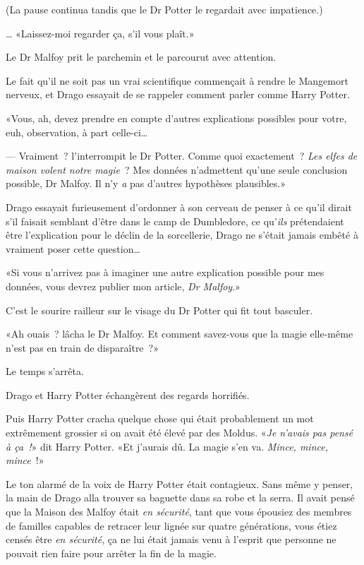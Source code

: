(La pause continua tandis que le Dr Potter le regardait avec impatience.)

… «Laissez-moi regarder ça, s'il vous plaît.»

Le Dr Malfoy prit le parchemin et le parcourut avec attention.

Le fait qu'il ne soit pas un vrai scientifique commençait à rendre le Mangemort nerveux, et Drago essayait de se rappeler comment parler comme Harry Potter.

«Vous, ah, devez prendre en compte d'autres explications possibles pour votre, euh, observation, à part celle-ci…

--- Vraiment~? l'interrompit le Dr Potter. Comme quoi exactement~? \emph{Les elfes de maison volent notre magie}~? Mes données n'admettent qu'une seule conclusion possible, Dr Malfoy. Il n'y \emph{a} pas d'autres hypothèses plausibles.»

Drago essayait furieusement d'ordonner à son cerveau de penser à ce qu'il dirait s'il faisait semblant d'être dans le camp de Dumbledore, ce qu'\emph{ils} prétendaient être l'explication pour le déclin de la sorcellerie, Drago ne s'était jamais embêté à vraiment poser cette question…

«Si vous n'arrivez pas à imaginer une autre explication possible pour mes données, vous devrez publier mon article, \emph{Dr Malfoy}.»

C'est le sourire railleur sur le visage du Dr Potter qui fit tout basculer.

«Ah ouais~? lâcha le Dr Malfoy. Et comment savez-vous que la magie elle-même n'est pas en train de disparaître~?»

Le temps s'arrêta.

Drago et Harry Potter échangèrent des regards horrifiés.

Puis Harry Potter cracha quelque chose qui était probablement un mot extrêmement grossier si on avait été élevé par des Moldus. «\emph{Je n'avais pas pensé à ça~!}» dit Harry Potter. «Et j'aurais dû. La magie s'en va. \emph{Mince, mince, mince}~!»

Le ton alarmé de la voix de Harry Potter était contagieux. Sans même y penser, la main de Drago alla trouver sa baguette dans sa robe et la serra. Il avait pensé que la Maison des Malfoy était \emph{en sécurité}, tant que vous épousiez des membres de familles capables de retracer leur lignée sur quatre générations, vous étiez censés être \emph{en sécurité}, ça ne lui était jamais venu à l'esprit que personne ne pouvait rien faire pour arrêter la fin de la magie.

